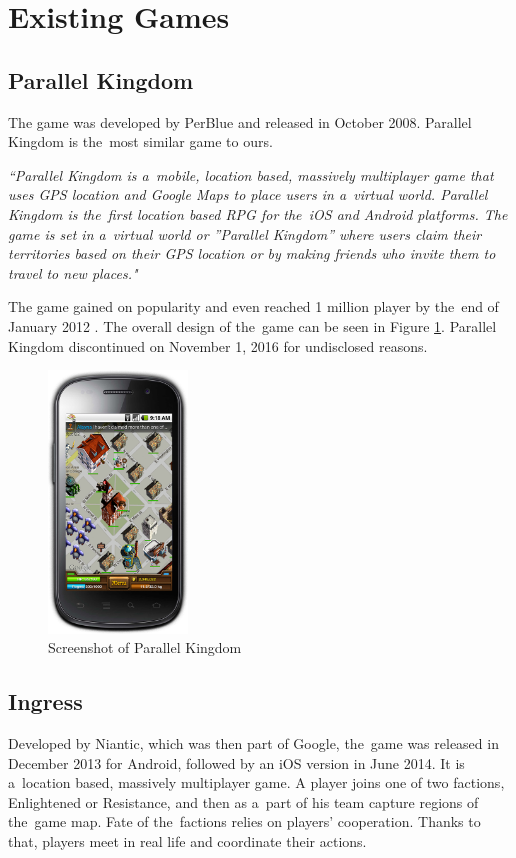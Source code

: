 
\section{Existing Games}

	\subsection{Parallel Kingdom}
	The game was developed by PerBlue and released in October 2008. Parallel Kingdom is the~most similar game to ours.
		
	\textit{``Parallel Kingdom is a~mobile, location based, massively multiplayer game that uses GPS location and Google Maps to place users in a~virtual world. Parallel Kingdom is the~first location based RPG for the~iOS and Android platforms. The game is set in a~virtual world or ”Parallel Kingdom” where users claim their territories based on their GPS location or by making friends who invite them to travel to new places."} \cite{parallelkingdom}
	
	The game gained on popularity and even reached 1 million player by the~end of January 2012 \cite{parallelkingdom1m}. The overall design of the~game can be seen in Figure \ref{fig:parallelkingdom}. Parallel Kingdom discontinued on November 1, 2016 for undisclosed reasons.
	
	\begin{figure}[h]	
		\includegraphics[width=0.33\textwidth]{figures/parallelkingdom}
		\centering			
		\caption{Screenshot of Parallel Kingdom \cite{parallelkingdomscreen}}
		\label{fig:parallelkingdom}
	\end{figure}
	
	\subsection{Ingress}
	Developed by Niantic, which was then part of Google, the~game was released in December 2013 for Android, followed by an iOS version in June 2014. It is a~location based, massively multiplayer game. A player joins one of two factions, Enlightened or Resistance, and then as a~part of his team capture regions of the~game map. Fate of the~factions relies on players’ cooperation. Thanks to that, players meet in real life and coordinate their actions.
	
